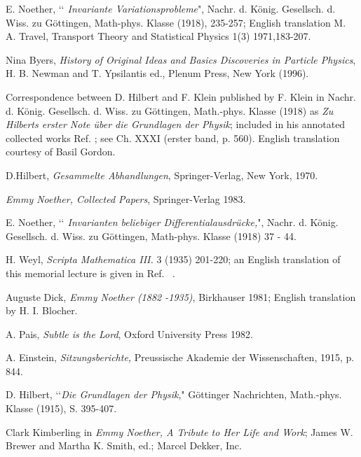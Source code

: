 \documentclass[12pt]{article}
\begin{document}
\onecolumn
\begin{thebibliography}{999}
 E. Noether, 
\lq\lq{\it{ Invariante Variationsprobleme}}", Nachr. d. K\"{o}nig. Gesellsch. d.
Wiss. zu G\"{o}ttingen, Math-phys. Klasse (1918), 235-257; English translation
M. A. Travel, Transport Theory and Statistical Physics 1(3) 1971,183-207.

 Nina Byers, {\it{History of Original Ideas and Basics Discoveries
in Particle Physics}}, H. B. Newman and T. Ypsilantis ed., Plenum Press, New York (1996).

 Correspondence between D. Hilbert and F. Klein published by
F. Klein in 
Nachr.  d. K\"{o}nig. Gesellsch. d.
Wiss. zu G\"{o}ttingen, Math.-phys. Klasse (1918) as 
{\it{Zu Hilberts erster Note \"uber die Grundlagen der Physik}};  included
  in his annotated collected works Ref. \cite{felix}; see
Ch. XXXI (erster band, p. 560).  English translation courtesy of Basil Gordon.

 D.Hilbert, {\it{Gesammelte Abhandlungen}}, Springer-Verlag, New
York, 1970.
 
 {\it{Emmy Noether, Collected Papers}}, Springer-Verlag 1983.


 E. Noether, \lq\lq{\it{ Invarianten beliebiger
Differentialausdr{\"{u}}cke,}}", Nachr. d. K\"{o}nig. Gesellsch. d.
Wiss. zu G\"{o}ttingen, Math-phys. Klasse (1918) 37 - 44.

 H. Weyl,
 {\it{Scripta Mathematica III.}} 3 (1935) 201-220; an English translation of
this memorial lecture is given 
 in Ref. ~\cite{Dick}.

 Auguste Dick,{\it{ Emmy Noether (1882 -1935)}},  Birkhauser 1981; English translation by  H. I. Blocher.


 A. Pais, {\it{Subtle is the Lord}}, Oxford University Press 
1982.


 A. Einstein, {\it{Sitzungsberichte,}} Preussische Akademie
der Wissenschaften, 1915, p. 844.


 D. Hilbert, \lq\lq{\it{Die Grundlagen der Physik}}," 
G\"ottinger Nachrichten, Math.-phys. Klasse (1915), S. 395-407.



 Clark Kimberling in {\it{Emmy Noether, A Tribute to Her Life 
and Work}}; James W. Brewer and Martha K. Smith, ed.; Marcel Dekker, Inc.




\end{thebibliography}
\end{document}

